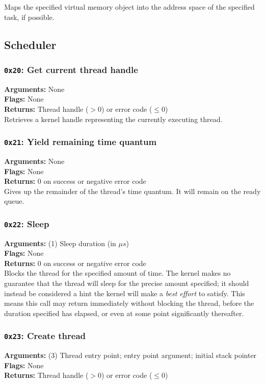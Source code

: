 \documentclass[11pt]{article}
\begin{document}
Maps the specified virtual memory object into the address space of the specified task, if possible.

\newpage
\subsection{Scheduler}
\subsubsection{{\tt 0x20}: Get current thread handle}
\textbf{Arguments:} None \\
\textbf{Flags:} None \\
\textbf{Returns:} Thread handle ($>0$) or error code ($\leq0$) \\

Retrieves a kernel handle representing the currently executing thread.

\subsubsection{{\tt 0x21}: Yield remaining time quantum}
\textbf{Arguments:} None \\
\textbf{Flags:} None \\
\textbf{Returns:} 0 on success or negative error code \\

Gives up the remainder of the thread's time quantum. It will remain on the ready queue.

\subsubsection{{\tt 0x22}: Sleep}
\textbf{Arguments:} (1) Sleep duration (in $\mu s$) \\
\textbf{Flags:} None \\
\textbf{Returns:} 0 on success or negative error code \\

Blocks the thread for the specified amount of time. The kernel makes no guarantee that the thread will sleep for the precise amount specified; it should instead be considered a hint the kernel will make a \textit{best effort} to satisfy. This means this call may return immediately without blocking the thread, before the duration specified has elapsed, or even at some point significantly thereafter.

\subsubsection{{\tt 0x23}: Create thread}
\textbf{Arguments:} (3) Thread entry point; entry point argument; initial stack pointer \\
\textbf{Flags:} None \\
\textbf{Returns:} Thread handle ($>0$) or error code ($\leq0$) \\
\end{document}

